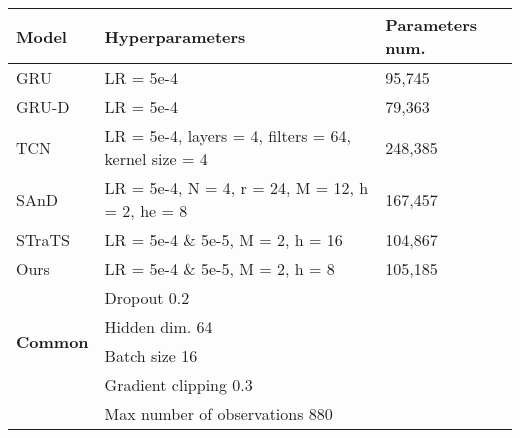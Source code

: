 \begin{tabular}{lll}
\toprule
\textbf{Model} & \textbf{Hyperparameters} & \textbf{Parameters num.} \\
\midrule
GRU & LR = 5e-4 & 95,745 \\
GRU-D & LR = 5e-4 & 79,363 \\
TCN & LR = 5e-4, layers = 4, filters = 64, kernel size = 4 & 248,385 \\
SAnD & LR = 5e-4, N = 4, r = 24, M = 12, h = 2, he = 8 & 167,457 \\
STraTS & LR = 5e-4 \& 5e-5, M = 2, h = 16 & 104,867 \\
Ours & LR = 5e-4 \& 5e-5, M = 2, h = 8 & 105,185 \\
\midrule
\multirow{4}{*}{\textbf{Common}}
& Dropout 0.2 \\
& Hidden dim. 64 \\
& Batch size 16 \\
& Gradient clipping 0.3 \\
& Max number of observations 880 \\
\bottomrule
\end{tabular}
